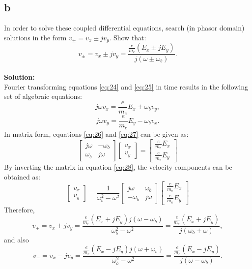 \documentclass[11pt]{amsart}
\begin{document}
\subsection*{b}
In order to solve these coupled differential equations, search (in phasor domain) solutions
in the form $v_{\pm}=v_x \pm j v_y$. Show that:
\begin{equation*}
v_{\pm}=v_x \pm j v_y=\frac{\frac{e}{m_e}(E_x \pm j E_y)}{j (\omega \pm \omega_b) }.
\end{equation*}
\\
\textbf{Solution:}\\
Fourier transforming equations \ref{eq:24} and \ref{eq:25} in time results in the following set of algebraic equations:
\begin{equation}
\label{eq:26}
j \omega v_x =\frac{e}{m_e} E_x+ \omega_b v_y,
\end{equation}
\begin{equation}
\label{eq:27}
j \omega v_y =\frac{e}{m_e} E_y - \omega_b v_x.
\end{equation}
In matrix form, equations \ref{eq:26} and \ref{eq:27} can be given as:
\begin{equation}
\label{eq:28}
\begin{bmatrix}
j \omega & -\omega_b \\  
\omega_b & j \omega
\end{bmatrix} 
\begin{bmatrix}
v_x  \\ 
 v_y
\end{bmatrix} 
=
\begin{bmatrix}
\frac{e}{m_e} E_x \\ 
\frac{e}{m_e} E_y
\end{bmatrix} 
\end{equation}
By inverting the matrix in equation \ref{eq:28}, the velocity components can be obtained as:
\begin{equation}
\label{eq:29}
\begin{bmatrix}
v_x  \\ 
 v_y
\end{bmatrix} 
=
\frac{1}{\omega_{b}^2 -\omega^2}
\begin{bmatrix}
j \omega & \omega_b \\  
-\omega_b & j \omega
\end{bmatrix} 
\begin{bmatrix}
\frac{e}{m_e} E_x \\ 
\frac{e}{m_e} E_y
\end{bmatrix} 
\end{equation}
Therefore,
\begin{equation}
\label{eq:30}
v_+ = v_x+ j v_y = \frac{\frac{e}{m_e}(E_x + j E_y)j(\omega-\omega_b)}{\omega_{b}^2 -\omega^2}=\frac{\frac{e}{m_e}(E_x + j E_y)}{j(\omega_{b} +\omega)},
\end{equation}
and also
\begin{equation}
\label{eq:31}
v_- = v_x- j v_y = \frac{\frac{e}{m_e}(E_x - j E_y)j(\omega+\omega_b)}{\omega_{b}^2 -\omega^2}=\frac{\frac{e}{m_e}(E_x - j E_y)}{j(\omega -\omega_b)}.
\end{equation}
\end{document}

